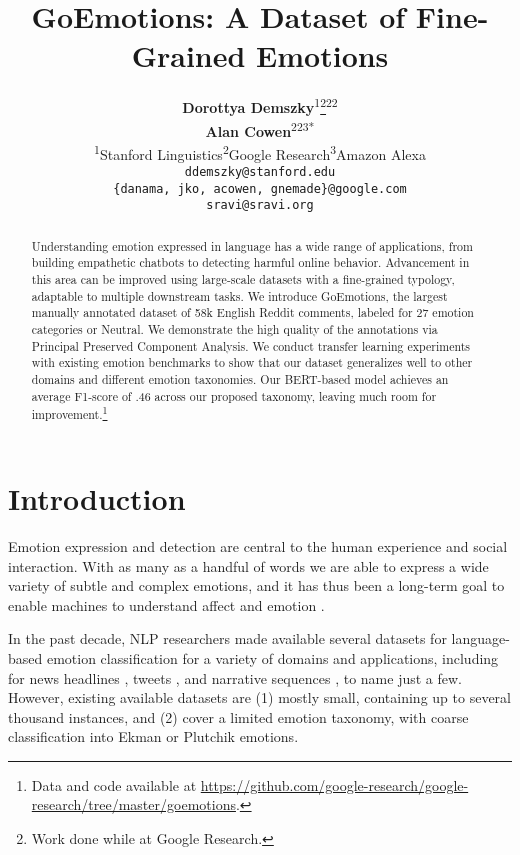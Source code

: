 \documentclass[11pt,a4paper]{article}
\title{GoEmotions: A Dataset of Fine-Grained Emotions}
\author{{\bf Dorottya Demszky}\textsuperscript{1}\thanks{\quad Work done while at Google Research.}\quad {\bf Dana Movshovitz-Attias}\textsuperscript{2}\quad {\bf Jeongwoo Ko}\textsuperscript{2}\vspace{1mm}\\{\bf Alan Cowen}\textsuperscript{2}\quad {\bf Gaurav Nemade}\textsuperscript{2}\quad {\bf Sujith Ravi}\textsuperscript{3}\textsuperscript{*}\vspace{1mm}\\\textsuperscript{1}Stanford Linguistics\quad \textsuperscript{2}Google Research\quad\textsuperscript{3}Amazon Alexa\vspace{1mm}\\ \texttt{ddemszky@stanford.edu}\\\texttt{\{danama, jko, acowen, gnemade\}@google.com}\\\texttt{sravi@sravi.org}}
\date{}
\date{}
\begin{document}
\maketitle
\begin{abstract}
  


Understanding emotion expressed in language has a wide range of applications, from building empathetic chatbots to detecting harmful online behavior.  Advancement in this area can be improved using large-scale datasets with a fine-grained typology, adaptable to multiple downstream tasks. We introduce GoEmotions, the largest manually annotated dataset of 58k English Reddit comments, labeled for 27 emotion categories or Neutral. We demonstrate the high quality of the annotations via Principal Preserved Component Analysis. We conduct transfer learning experiments with existing emotion benchmarks to show that our dataset generalizes well to other domains and different emotion taxonomies. Our BERT-based model achieves an average F1-score of .46 across our proposed taxonomy, leaving much room for improvement.\footnote{Data and code available at \url{https://github.com/google-research/google-research/tree/master/goemotions}.}
\end{abstract}

\section{Introduction}

Emotion expression and detection are central to the human experience and social interaction.
With as many as a handful of words we are able to express a wide variety of subtle and complex emotions, and it has thus been a long-term goal to enable machines to understand affect and emotion \citep{picard1997affective}.



In the past decade, NLP researchers made available several datasets for language-based emotion classification for a variety of domains and applications, including for news headlines \citep{affective-text-2007-semeval}, tweets \citep{crowdflower-2016,mohammad-etal-2018-semeval}, and narrative sequences \citep{liu2019dens}, to name just a few. However, existing available datasets are (1) mostly small, containing up to several thousand instances, and (2) cover a limited emotion taxonomy, with coarse classification into Ekman \citep{ekman1992argument} or Plutchik \citep{plutchik1980general} emotions.
\end{document}
